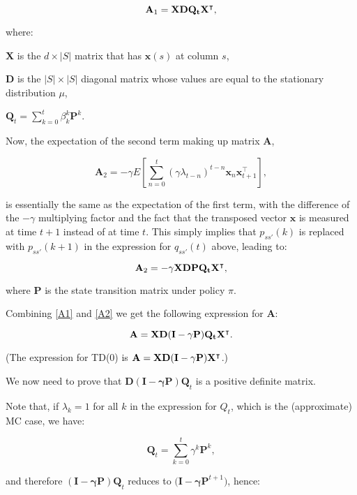 \documentclass[11pt,A4paper]{article}
\begin{document}
\begin{equation} \label{A1}
\mathbf{A}_1 = \bf X D Q_t X^\intercal,
\end{equation}

where:

$\mathbf{X}$ is the $d \times |S|$ matrix that has $\mathbf{x}(s)$ at column $s$,

$\mathbf{D}$ is the $|S| \times |S|$ diagonal matrix whose values are equal to the stationary distribution $\mu$,

$\mathbf{Q}_t = \sum_{k=0}^{t}{ \beta_k^{k} \mathbf{P}^k }$.

\medskip

Now, the expectation of the second term making up matrix $\mathbf{A}$,

\[ \mathbf{A}_2 = -\gamma E[ \sum_{n=0}^{t}{ (\gamma \lambda_{t-n})^{t-n} \mathbf{x}_n} \mathbf{x}_{t+1}^\intercal ], \]

is essentially the same as the expectation of the first term, with the difference of the $-\gamma$ multiplying factor and the fact that the transposed vector $\mathbf{x}$ is measured at time $t+1$ instead of at time $t$. This simply implies that $p_{ss'}(k)$ is replaced with $p_{ss'}(k+1)$ in the expression for $q_{ss'}(t)$ above, leading to:

\begin{equation} \label{A2}
\mathbf{A}_2 = -\gamma \bf X D P Q_t X^\intercal,
\end{equation}

where $\mathbf{P}$ is the state transition matrix under policy $\pi$.

Combining \eqref{A1} and \eqref{A2} we get the following expression for $\mathbf{A}$:

\begin{equation}
\mathbf{A} = \bf X D (I - \gamma P) Q_t X^\intercal.
\end{equation}

(The expression for TD(0) is $\mathbf{A} = \bf X D (I - \gamma P) X^\intercal$.)

\medskip

We now need to prove that $\mathbf{D (I - \gamma P) Q}_t$ is a positive definite matrix.

Note that, if $\lambda_k = 1$ for all $k$ in the expression for $Q_t$, which is the (approximate) MC case, we have:

\[ \mathbf{Q}_t = \sum_{k=0}^{t}{ \gamma^{k} \mathbf{P}^k }, \]

and therefore $\mathbf{(I - \gamma P) Q}_t$ reduces to $\mathbf{(I - \gamma P}^{t+1})$, hence:
\end{document}
